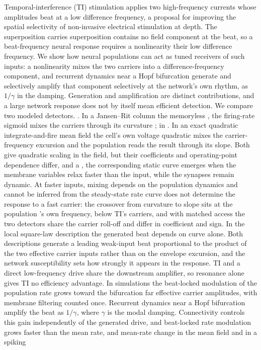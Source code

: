 \documentclass[11pt,a4paper]{article}
\providecommand{\DIFaddtex}[1]{{\protect\color{blue} \sf #1}} %
\providecommand{\DIFdeltex}[1]{{\protect\color{red} \scriptsize #1}} %
\providecommand{\DIFaddbegin}{} %
\providecommand{\DIFaddend}{} %
\providecommand{\DIFdelbegin}{} %
\providecommand{\DIFdelend}{} %
\providecommand{\DIFadd}[1]{\texorpdfstring{\DIFaddtex{#1}}{#1}} %
\providecommand{\DIFdel}[1]{\texorpdfstring{\DIFdeltex{#1}}{}} %
\begin{document}
\else
\noindent
Temporal-interference (TI) stimulation applies two high-frequency currents whose
\DIFdelbegin \DIFdel{amplitudes
beat at a low difference frequency, a proposal for improving the spatial selectivity of
non-invasive electrical stimulation at depth. The superposition carries }\DIFdelend \DIFaddbegin \DIFadd{superposition contains }\DIFaddend no field component at \DIFdelbegin \DIFdel{the beat, so a beat-frequency neural response requires a nonlinearity}\DIFdelend \DIFaddbegin \DIFadd{their low difference frequency}\DIFaddend . We show
how neural populations can \DIFdelbegin \DIFdel{act as tuned receivers of such inputs: a nonlinearity mixes the two carriers
into a difference-frequency component, and recurrent dynamics near a Hopf bifurcation }\DIFdelend \DIFaddbegin \DIFadd{generate and selectively }\DIFaddend amplify that component\DIFdelbegin \DIFdel{selectively at the network's own rhythm, as $1/\gamma$ in the damping. Generation and amplification are distinct contributions, and a large network response does
not by itself mean efficient detection. We compare two modeled detectors. }\DIFdelend \DIFaddbegin \DIFadd{. }\DIFaddend In a
Jansen--Rit column\DIFdelbegin \DIFdel{the memoryless }\DIFdelend \DIFaddbegin \DIFadd{, the }\DIFaddend firing-rate sigmoid mixes \DIFaddbegin \DIFadd{the carriers }\DIFaddend through its curvature\DIFdelbegin \DIFdel{; in }\DIFdelend \DIFaddbegin \DIFadd{.
In }\DIFaddend an exact quadratic integrate-and-fire mean field\DIFdelbegin \DIFdel{the cell's own voltage quadratic mixes the carrier-frequency
excursion and the population reads the result through its slope. Both give quadratic scaling
in the field, but their coefficients and operating-point dependence differ, and a
}\DIFdelend \DIFaddbegin \DIFadd{, the corresponding static curve
emerges when the membrane variables relax faster than the input, while the synapses
remain dynamic. At faster inputs, mixing depends on the population dynamics and
cannot be inferred from the }\DIFaddend steady-state \DIFdelbegin \DIFdel{rate curve does not determine the response to a fast carrier: the crossover
from curvature to slope sits at the population 's own frequency, below TI's carriers, and
with matched access the two detectors share the carrier roll-off and differ in coefficient
and sign. In the
local square-law description the generated beat depends on }\DIFdelend \DIFaddbegin \DIFadd{curve alone. Both descriptions generate a
leading weak-input beat proportional to }\DIFaddend the product of the \DIFdelbegin \DIFdel{two effective carrier inputs rather than on the envelope excursion,
and the network susceptibility sets how
strongly it appears in the response. TI and a direct low-frequency drive share the downstream
amplifier, so resonance alone gives TI no efficiency advantage. In simulations the beat-locked modulation of the population rate
grows toward the bifurcation far }\DIFdelend \DIFaddbegin \DIFadd{effective carrier amplitudes,
with membrane filtering counted once. Recurrent dynamics near a Hopf bifurcation
amplify the beat as $1/\gamma$, where $\gamma$ is the modal damping. Connectivity
controls this gain independently of the generated drive, and beat-locked rate
modulation grows }\DIFaddend faster than the \DIFdelbegin \DIFdel{mean rate, and }\DIFdelend \DIFaddbegin \DIFadd{mean-rate change in the mean field and in }\DIFaddend a spiking
\end{document}
